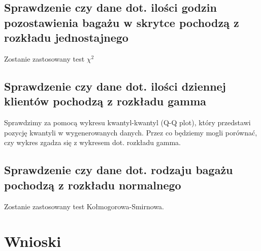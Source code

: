 \documentclass{article}
\begin{document}
\subsection{Sprawdzenie czy dane dot. ilości godzin pozostawienia bagażu w skrytce pochodzą z rozkładu jednostajnego }
Zostanie zastosowany test $\chi^2$ \\

\subsection{Sprawdzenie czy dane dot. ilości dziennej klientów pochodzą z rozkładu gamma }
Sprawdzimy za pomocą wykresu kwantyl-kwantyl (Q-Q plot), który przedstawi pozycję  kwantyli w wygenerowanych danych. Przez co będziemy mogli porównać, czy wykres zgadza się z wykresem dot. rozkładu gamma.
\subsection{Sprawdzenie czy dane dot. rodzaju bagażu pochodzą z rozkładu normalnego }
Zostanie zastosowany test Kołmogorowa-Smirnowa.
\section{Wnioski}
\end{document}
